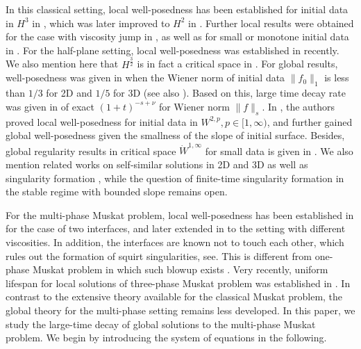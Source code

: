 \documentclass[11pt]{article}
\theoremstyle{definition}
\numberwithin{equation}{section}
\begin{document}
In this classical setting, local well-posedness has been established for initial data in $H^3$ in \cite{CordobaContourDynamics}, which was later improved to $H^2$ in \cite{CHENG201632}. Further local results were obtained for the case with viscosity jump in \cite{CCG08,CCG13}, as well as for small or monotone initial data in \cite{Deng2016OnT2,SCRH04}. For the half-plane setting, local well-posedness was established in \cite{Zlato2024The2M} recently. We also mention here that $H^{\frac{3}{2}}$ is in fact a critical space in \cite{AQ22}. For global results, well-posedness was given in \cite{Constantin2010OnTG} when the Wiener norm of initial data $\|f_0\|_1$ is less than $1/3$ for 2D and $1/5$ for 3D (see also \cite{CCGS13}). Based on this, large time decay rate was given in \cite{Patel03062017} of exact $(1+t)^{-s+\nu}$ for Wiener norm $\|f\|_s$. In \cite{CGSV15}, the authors proved local well-posedness for initial data in $W^{2,p},p\in[1,\infty)$, and further gained global well-posedness given the smallness of the slope of initial surface. Besides, global regularity results in critical space $\dot{W}^{1,\infty}$ for small data is given in \cite{Cameron19,Cameron2020GlobalWF}. We also mention related works on self-similar solutions in 2D and 3D \cite{JSNP21,Na2025GlobalSS} as well as singularity formation \cite{CCFG12,Castro2011RayleighTaylorBF,GomezSerrano2013OnTW,Zlato2024The2M111,Zlato2024The2M}, while the question of finite-time singularity formation in the stable regime with bounded slope remains open.

For the multi-phase Muskat problem, local well-posedness has been established in \cite{Bierler2021TheMM} for the case of two interfaces, and later extended in \cite{Bierler2025TheMM} to the setting with different viscosities. In addition, the interfaces are known not to touch each other, which rules out the formation of squirt singularities, see\cite{Crdoba2009AbsenceOS,Gancedo2013AbsenceOS}. This is different from one-phase Muskat problem in which such blowup exists \cite{Castro2013SplashSF,Crdoba2018OnTS}. Very recently, uniform lifespan for local solutions of three-phase Muskat problem was established in \cite{Castro2025ThreephaseMP}. In contrast to the extensive theory available for the classical Muskat problem, the global theory for the multi-phase setting remains less developed. In this paper, we study the large-time decay of global solutions to the multi-phase Muskat problem. We begin by introducing the system of equations in the following.
\end{document}
